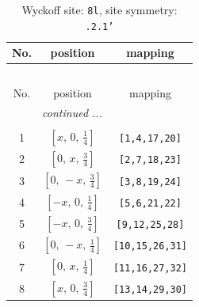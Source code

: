 \documentclass[fleqn,8pt]{jsarticle}
\begin{document}
\begin{longtable}{ccc}
\caption{Wyckoff site: {\tt 8l}, site symmetry: {\tt .2.1'}}
 \\
 \hline \hline
No. & position & mapping \\ \hline \endfirsthead

\multicolumn{2}{l}{\tablename\ \thetable{}} \\
 \hline \hline
No. & position & mapping \\ \hline \endhead

 \hline \hline
\multicolumn{2}{r}{\footnotesize\it continued ...} \\ \endfoot

 \hline \hline
\multicolumn{2}{r}{} \\ \endlastfoot

1 & $\left[ x,\, 0,\, \frac{1}{4} \right]$ & {\tt [1,4,17,20]} \\ \hline
2 & $\left[ 0,\, x,\, \frac{3}{4} \right]$ & {\tt [2,7,18,23]} \\ \hline
3 & $\left[ 0,\, - x,\, \frac{3}{4} \right]$ & {\tt [3,8,19,24]} \\ \hline
4 & $\left[ - x,\, 0,\, \frac{1}{4} \right]$ & {\tt [5,6,21,22]} \\ \hline
5 & $\left[ - x,\, 0,\, \frac{3}{4} \right]$ & {\tt [9,12,25,28]} \\ \hline
6 & $\left[ 0,\, - x,\, \frac{1}{4} \right]$ & {\tt [10,15,26,31]} \\ \hline
7 & $\left[ 0,\, x,\, \frac{1}{4} \right]$ & {\tt [11,16,27,32]} \\ \hline
8 & $\left[ x,\, 0,\, \frac{3}{4} \right]$ & {\tt [13,14,29,30]} \\
\end{longtable}
\renewcommand{\arraystretch}{1.2}
\end{document}
